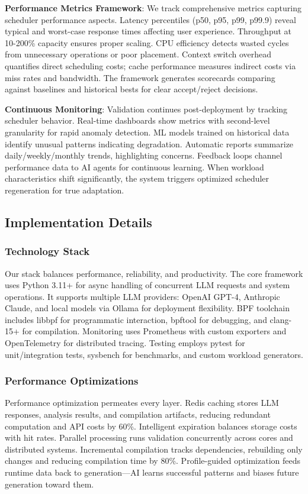 \textbf{Performance Metrics Framework}: We track comprehensive metrics capturing scheduler performance aspects. Latency percentiles (p50, p95, p99, p99.9) reveal typical and worst-case response times affecting user experience. Throughput at 10-200\% capacity ensures proper scaling. CPU efficiency detects wasted cycles from unnecessary operations or poor placement. Context switch overhead quantifies direct scheduling costs; cache performance measures indirect costs via miss rates and bandwidth. The framework generates scorecards comparing against baselines and historical bests for clear accept/reject decisions.

\textbf{Continuous Monitoring}: Validation continues post-deployment by tracking scheduler behavior. Real-time dashboards show metrics with second-level granularity for rapid anomaly detection. ML models trained on historical data identify unusual patterns indicating degradation. Automatic reports summarize daily/weekly/monthly trends, highlighting concerns. Feedback loops channel performance data to AI agents for continuous learning. When workload characteristics shift significantly, the system triggers optimized scheduler regeneration for true adaptation.


\subsection{Implementation Details}

\subsubsection{Technology Stack}
Our stack balances performance, reliability, and productivity. The core framework uses Python 3.11+ for async handling of concurrent LLM requests and system operations. It supports multiple LLM providers: OpenAI GPT-4, Anthropic Claude, and local models via Ollama for deployment flexibility. BPF toolchain includes libbpf for programmatic interaction, bpftool for debugging, and clang-15+ for compilation. Monitoring uses Prometheus with custom exporters and OpenTelemetry for distributed tracing. Testing employs pytest for unit/integration tests, sysbench for benchmarks, and custom workload generators.

\subsubsection{Performance Optimizations}
Performance optimization permeates every layer. Redis caching stores LLM responses, analysis results, and compilation artifacts, reducing redundant computation and API costs by 60\%. Intelligent expiration balances storage costs with hit rates. Parallel processing runs validation concurrently across cores and distributed systems. Incremental compilation tracks dependencies, rebuilding only changes and reducing compilation time by 80\%. Profile-guided optimization feeds runtime data back to generation—AI learns successful patterns and biases future generation toward them.

